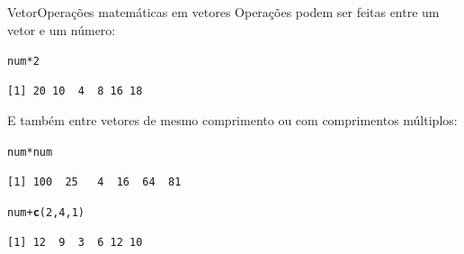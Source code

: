 \documentclass[10pt,handout]{beamer}\usepackage[]{graphicx}\usepackage[]{color}
\makeatletter
\newcommand{\hlnum}[1]{\textcolor[rgb]{0.686,0.059,0.569}{#1}}%
\newcommand{\hlopt}[1]{\textcolor[rgb]{0,0,0}{#1}}%
\newcommand{\hlstd}[1]{\textcolor[rgb]{0.345,0.345,0.345}{#1}}%
\newcommand{\hlkwd}[1]{\textcolor[rgb]{0.737,0.353,0.396}{\textbf{#1}}}%
\newenvironment{kframe}{%
 \def\at@end@of@kframe{}%
 \ifinner\ifhmode%
  \def\at@end@of@kframe{\end{minipage}}%
  \begin{minipage}{\columnwidth}%
 \fi\fi%
 \def\FrameCommand##1{\hskip\@totalleftmargin \hskip-\fboxsep
 \colorbox{shadecolor}{##1}\hskip-\fboxsep
     \hskip-\linewidth \hskip-\@totalleftmargin \hskip\columnwidth}%
 \MakeFramed {\advance\hsize-\width
   \@totalleftmargin\z@ \linewidth\hsize
   \@setminipage}}%
 {\par\unskip\endMakeFramed%
 \at@end@of@kframe}
\newenvironment{knitrout}{}{} %
\makeatother
\begin{document}
\begin{frame}[fragile]{Vetor}{Operações matemáticas em vetores}
Operações podem ser feitas entre um vetor e um número:
\begin{knitrout}\small
{}\color{fgcolor}\begin{kframe}
\begin{alltt}
\hlstd{num} \hlopt{*} \hlnum{2}
\end{alltt}
\begin{verbatim}
[1] 20 10  4  8 16 18
\end{verbatim}
\end{kframe}
\end{knitrout}
E também entre vetores de mesmo comprimento ou com comprimentos
múltiplos:
\begin{knitrout}\small
{}\color{fgcolor}\begin{kframe}
\begin{alltt}
\hlstd{num} \hlopt{*} \hlstd{num}
\end{alltt}
\begin{verbatim}
[1] 100  25   4  16  64  81
\end{verbatim}
\begin{alltt}
\hlstd{num} \hlopt{+} \hlkwd{c}\hlstd{(}\hlnum{2}\hlstd{,} \hlnum{4}\hlstd{,} \hlnum{1}\hlstd{)}
\end{alltt}
\begin{verbatim}
[1] 12  9  3  6 12 10
\end{verbatim}
\end{kframe}
\end{knitrout}
\end{frame}
\end{document}
